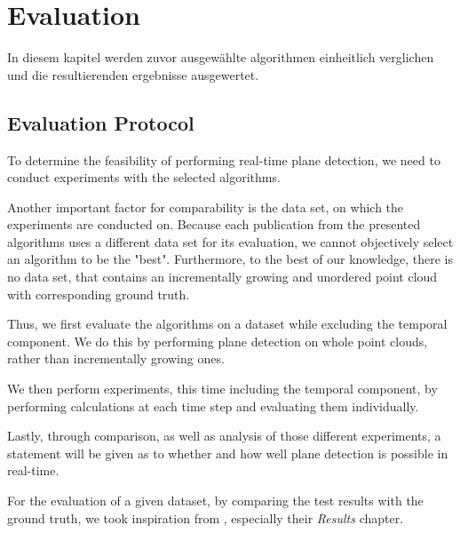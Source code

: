 \documentclass[main.tex]{subfiles}
\begin{document}
\chapter{Evaluation}

In diesem kapitel werden zuvor ausgewählte algorithmen einheitlich verglichen und die resultierenden ergebnisse ausgewertet.

\section{Evaluation Protocol}

To determine the feasibility of performing real-time plane detection, we need to conduct experiments with the selected algorithms.

Another important factor for comparability is the data set, on which the experiments are conducted on.
Because each publication from the presented algorithms uses a different data set for its evaluation, we cannot objectively select an algorithm to be the "best".
Furthermore, to the best of our knowledge, there is no data set, that contains an incrementally growing and unordered point cloud with corresponding ground truth.

Thus, we first evaluate the algorithms on a dataset while excluding the temporal component. We do this by performing plane detection on whole point clouds, rather than
incrementally growing ones.

We then perform experiments, this time including the temporal component, by performing calculations at each time step and evaluating them individually.

Lastly, through comparison, as well as analysis of those different experiments, a statement will be given as to whether and how well plane detection is
possible in real-time.

For the evaluation of a given dataset, by comparing the test results with the ground truth, we took inspiration from \citeauthor{Araújo_Oliveira_2020} ,
especially their \textit{Results} chapter.
\end{document}
